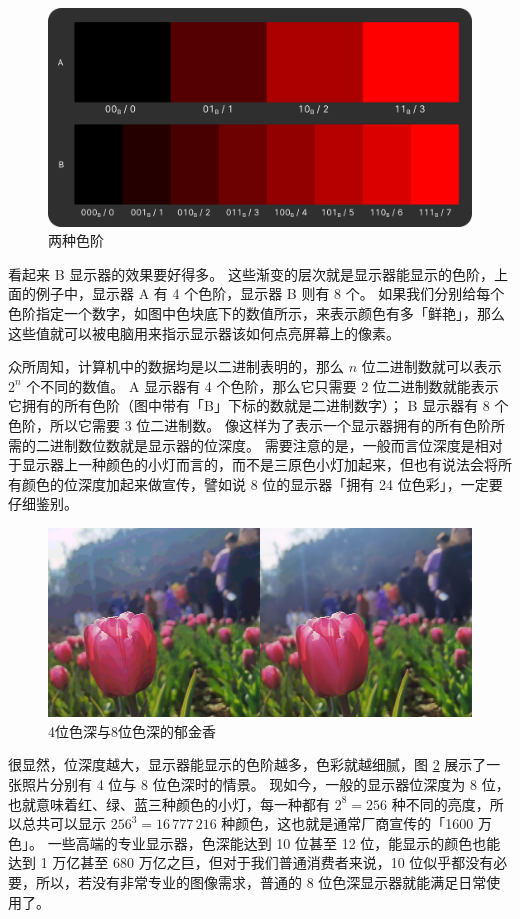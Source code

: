 \begin{figure}[htb!]
  \centering
  \includegraphics[width=.8\textwidth]{assets/Color_Gradient.png}
  \caption{两种色阶}
  \label{Color_Gradient}
\end{figure}

看起来 B 显示器的效果要好得多。
这些渐变的层次就是显示器能显示的色阶，上面的例子中，显示器 A 有 4 个色阶，显示器 B 则有 8 个。
如果我们分别给每个色阶指定一个数字，如图中色块底下的数值所示，来表示颜色有多「鲜艳」，那么这些值就可以被电脑用来指示显示器该如何点亮屏幕上的像素。

众所周知，计算机中的数据均是以二进制表明的，那么 $n$ 位二进制数就可以表示 $2^n$ 个不同的数值。
A 显示器有 4 个色阶，那么它只需要 2 位二进制数就能表示它拥有的所有色阶（图中带有「B」下标的数就是二进制数字）；
B 显示器有 8 个色阶，所以它需要 3 位二进制数。
像这样为了表示一个显示器拥有的所有色阶所需的二进制数位数就是显示器的位深度。
需要注意的是，一般而言位深度是相对于显示器上一种颜色的小灯而言的，而不是三原色小灯加起来，但也有说法会将所有颜色的位深度加起来做宣传，譬如说 8 位的显示器「拥有 24 位色彩」，一定要仔细鉴别。

\begin{figure}[htb!]
  \centering
  \includegraphics[width=.8\textwidth]{assets/4bit_vs_8bit.png}
  \caption{4位色深与8位色深的郁金香}
  \label{4bit_vs_8bit}
\end{figure}

很显然，位深度越大，显示器能显示的色阶越多，色彩就越细腻，图 \ref{4bit_vs_8bit} 展示了一张照片分别有 4 位与 8 位色深时的情景。
现如今，一般的显示器位深度为 8 位，也就意味着红、绿、蓝三种颜色的小灯，每一种都有 $2^8 = 256$ 种不同的亮度，所以总共可以显示 $256^3 = 16\,777\,216$ 种颜色，这也就是通常厂商宣传的「1600 万色」。
一些高端的专业显示器，色深能达到 10 位甚至 12 位，能显示的颜色也能达到 1 万亿甚至 680 万亿之巨，但对于我们普通消费者来说，10 位似乎都没有必要，所以，若没有非常专业的图像需求，普通的 8 位色深显示器就能满足日常使用了。

